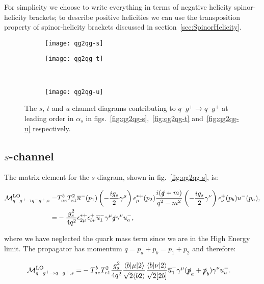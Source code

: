 	For simplicity we choose to write everything in terms of negative helicity spinor-helicity brackets;
	to describe positive helicities we can use the transposition property of spinor-helicity brackets discussed
	in section~\ref{sec:SpinorHelicity}.

	\begin{figure}[h]
		\centering
		\begin{subfigure}[b]{0.3\textwidth}
			\texttt{[image: qg2qg-s]}
			\caption{}
			\label{fig:qg2qg-s}
		\end{subfigure}

		\begin{subfigure}[b]{0.3\textwidth}
			\texttt{[image: qg2qg-t]}
			\caption{}
			\label{fig:qg2qg-t}
		\end{subfigure}
		~
		\begin{subfigure}[b]{0.3\textwidth}
			\texttt{[image: qg2qg-u]}
			\caption{}
			\label{fig:qg2qg-u}
		\end{subfigure}
		\caption{The $s$, $t$ and $u$ channel diagrams contributing to $q^-g^+\to q^-g^+$ at leading
		         order in $\alpha_s$ in figs.~\eqref{fig:qg2qg-s},~\eqref{fig:qg2qg-t} and~\eqref{fig:qg2qg-u}
		         respectively.}
		\label{fig:TwoToTwo2}
	\end{figure}

	\subsection{$s$-channel}

		The matrix element for the $s$-diagram, shown in fig.~\eqref{fig:qg2qg-s}, is:

		\begin{align}
			\mathcal{M}_{q^-g^+\to q^-g^+, s}^{\text{LO}}=&T^b_{ae}T^2_{e1}\overline{u}^-(p_1)\left(-\frac{ig_s}{2}\gamma^\mu\right)\epsilon_\mu^{*+}(p_2)
				\frac{i(\slashed q+m)}{q^2-m^2}\left(-\frac{ig_s}{2}\gamma^\nu\right)\epsilon^+_\nu(p_b)u^-(p_a), \\
			=&-\frac{g^2_s}{4q^2}\epsilon^{*+}_{2\mu}\epsilon^+_{b\nu}\overline{u}^-_1\gamma^\mu\slashed q\gamma^\nu u^-_a,
		\end{align}

		where we have neglected the quark mass term since we are in the High Energy limit.
		The propagator has momentum $q=p_a+p_b=p_1+p_2$ and therefore:

		\begin{align}
			\mathcal{M}_{q^-g^+\to q^-g^+, s}^{\text{LO}}=&-T^b_{ae}T^2_{e1}\frac{g^2_s}{4q^2}\frac{\langle{b}|\mu|2\rangle}{\sqrt{2}\langle{b2\rangle}}
			\frac{\langle{b}|\nu|2\rangle}{\sqrt{2}[2b]}\overline{u}^-_1\gamma^\mu(\slashed{p}_a+\slashed{p}_b)\gamma^\nu u^-_a.
		\end{align}

